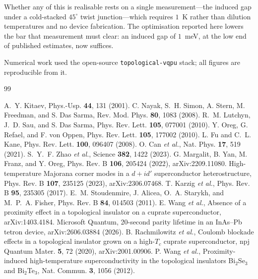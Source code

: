 \documentclass[aps,prb,twocolumn,superscriptaddress,floatfix,nofootinbib]{revtex4-2}
\begin{document}
Whether any of this is realisable rests on a single measurement---the induced
gap under a cold-stacked $45^\circ$ twist junction---which requires $1$~K
rather than dilution temperatures and no device fabrication. The optimisation
reported here lowers the bar that measurement must clear: an induced gap of
$1$~meV, at the low end of published estimates, now suffices.

\begin{acknowledgments}
Numerical work used the open-source \texttt{topological-vqpu} stack; all
figures are reproducible from it.
\end{acknowledgments}

\begin{thebibliography}{99}

 A.~Y. Kitaev, Phys.-Usp. \textbf{44}, 131 (2001).
 C. Nayak, S.~H. Simon, A. Stern, M. Freedman, and
  S. Das Sarma, Rev. Mod. Phys. \textbf{80}, 1083 (2008).
 R.~M. Lutchyn, J.~D. Sau, and S. Das Sarma,
  Phys. Rev. Lett. \textbf{105}, 077001 (2010).
 Y. Oreg, G. Refael, and F. von Oppen,
  Phys. Rev. Lett. \textbf{105}, 177002 (2010).
 L. Fu and C.~L. Kane, Phys. Rev. Lett. \textbf{100},
  096407 (2008).
 O. Can \emph{et al.}, Nat. Phys. \textbf{17}, 519 (2021).
 S.~Y.~F. Zhao \emph{et al.}, Science \textbf{382}, 1422
  (2023).
 G. Margalit, B. Yan, M. Franz, and Y. Oreg,
  Phys. Rev. B \textbf{106}, 205424 (2022), arXiv:2209.11080.
 High-temperature Majorana corner modes in a $d+id'$
  superconductor heterostructure, Phys. Rev. B \textbf{107}, 235125 (2023),
  arXiv:2306.07468.
 T. Karzig \emph{et al.}, Phys. Rev. B \textbf{95},
  235305 (2017).
 E.~M. Stoudenmire, J. Alicea, O.~A. Starykh, and
  M.~P.~A. Fisher, Phys. Rev. B \textbf{84}, 014503 (2011).
 E. Wang \emph{et al.}, Absence of a proximity effect in a
  topological insulator on a cuprate superconductor, arXiv:1403.4184.
 Microsoft Quantum, 20-second parity lifetime in an
  InAs--Pb tetron device, arXiv:2606.03884 (2026).
 B. Rachmilowitz \emph{et al.}, Coulomb blockade
  effects in a topological insulator grown on a high-$T_c$ cuprate
  superconductor, npj Quantum Mater. \textbf{5}, 72 (2020), arXiv:2001.00906.
 P. Wang \emph{et al.}, Proximity-induced high-temperature
  superconductivity in the topological insulators Bi$_2$Se$_3$ and
  Bi$_2$Te$_3$, Nat. Commun. \textbf{3}, 1056 (2012).

\end{thebibliography}
\end{document}
